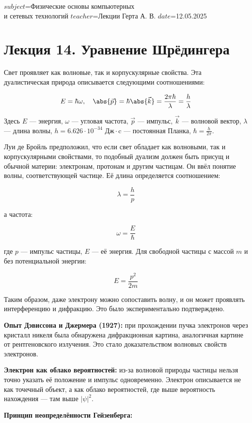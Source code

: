 $subject$=Физические основы компьютерных \\ и сетевых технологий
$teacher$=Лекции Герта А. В.
$date$=12.05.2025

\section{Лекция 14. Уравнение Шрёдингера}

Свет проявляет как волновые, так и корпускулярные свойства. Эта дуалистическая природа описывается следующими соотношениями:

\[
E = \hbar \omega, \quad \abs{\vec{p}} = \hbar \abs{\vec{k}} = \frac{2\pi \hbar}{\lambda} = \frac{h}{\lambda}
\]

Здесь $E$ — энергия, $\omega$ — угловая частота, $\vec{p}$ — импульс, $\vec{k}$ — волновой вектор, $\lambda$ — длина волны, $h = 6.626 \cdot 10^{-34} \text{ Дж}\cdot\text{c}$ — постоянная Планка, $\hbar = \frac{h}{2\pi}$.

Луи де Бройль предположил, что если свет обладает как волновыми, так и корпускулярными свойствами, то подобный дуализм должен быть присущ и обычной материи: электронам, протонам и другим частицам. Он ввёл понятие волны, соответствующей частице. Её длина определяется соотношением:

\[
\lambda = \frac{h}{p}
\]

а частота:

\[
\omega = \frac{E}{\hbar}
\]

где $p$ — импульс частицы, $E$ — её энергия. Для свободной частицы с массой $m$ и без потенциальной энергии:

\[
E = \frac{p^2}{2m}
\]

Таким образом, даже электрону можно сопоставить волну, и он может проявлять интерференцию и дифракцию. Это было экспериментально подтверждено.

\textbf{Опыт Дэвиссона и Джермера (1927):} при прохождении пучка электронов через кристалл никеля была обнаружена дифракционная картина, аналогичная картине от рентгеновского излучения. Это стало доказательством волновых свойств электронов.

\textbf{Электрон как облако вероятностей:} из-за волновой природы частицы нельзя точно указать её положение и импульс одновременно. Электрон описывается не как точечный объект, а как облако вероятностей, где выше вероятность нахождения — там выше $|\psi|^2$.

\textbf{Принцип неопределённости Гейзенберга:}

